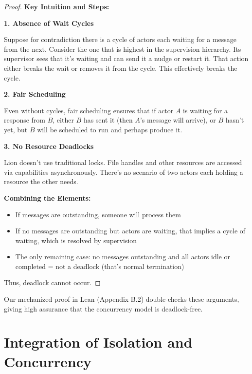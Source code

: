 \begin{proof}
\textbf{Key Intuition and Steps:}

\textbf{1. Absence of Wait Cycles}

Suppose for contradiction there is a cycle of actors each waiting for a message from the next. Consider the one that is highest in the supervision hierarchy. Its supervisor sees that it's waiting and can send it a nudge or restart it. That action either breaks the wait or removes it from the cycle. This effectively breaks the cycle.

\textbf{2. Fair Scheduling}

Even without cycles, fair scheduling ensures that if actor $A$ is waiting for a response from $B$, either $B$ has sent it (then $A$'s message will arrive), or $B$ hasn't yet, but $B$ will be scheduled to run and perhaps produce it.

\textbf{3. No Resource Deadlocks}

Lion doesn't use traditional locks. File handles and other resources are accessed via capabilities asynchronously. There's no scenario of two actors each holding a resource the other needs.

\textbf{Combining the Elements:}

\begin{itemize}
\item If messages are outstanding, someone will process them
\item If no messages are outstanding but actors are waiting, that implies a cycle of waiting, which is resolved by supervision
\item The only remaining case: no messages outstanding and all actors idle or completed = not a deadlock (that's normal termination)
\end{itemize}

Thus, deadlock cannot occur.
\end{proof}

\begin{remark}
Our mechanized proof in Lean (Appendix B.2) double-checks these arguments, giving high assurance that the concurrency model is deadlock-free.
\end{remark}

\newpage

\section{Integration of Isolation and Concurrency}

